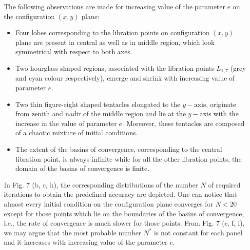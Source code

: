 \documentclass[preprint,fleqn,5p,numbers,sort&compress]{elsarticle}
\begin{document}
The following observations are made for increasing value of the parameter $e$ on the
configuration $(x, y)$ plane:
\begin{itemize}
  \item Four lobes corresponding to the libration points on configuration
  $(x, y)$ plane are present in central as well as in middle region, which look
  symmetrical with respect to both axes.
  \item Two hourglass shaped regions, associated with the libration points
  $L_{1,7}$ (grey and cyan colour respectively), emerge and shrink with increasing
  value of parameter $e$.
  \item Two thin figure-eight shaped tentacles elongated to the
  $y-$axis, originate from zenith and nadir of the middle region and lie at the $y-$axis
  with the increase in the value of parameter $e$. Moreover, these tentacles are composed of a
  chaotic mixture of initial conditions.
  \item The extent of the basins of convergence, corresponding to the central libration point, is always infinite while for all the other libration points, the domain of the basins of convergence is finite.
\end{itemize}
In Fig. \textcolor[rgb]{1.00,0.00,0.50}{7} (b, e, h), the corresponding distributions of the number $N$ of
required iterations to obtain the predefined accuracy are depicted. One can notice that almost every initial condition
on the configuration plane converges for $N< 20$ except for those points which lie on the boundaries of the basins
of convergence, i.e., the rate of convergence is much slower for those points.  From Fig. \textcolor[rgb]{1.00,0.00,0.50}{7} (c, f, i), we may argue that the most probable number
$N^*$ is not constant for each panel and it increases with increasing value of the parameter $e$.
\end{document}
